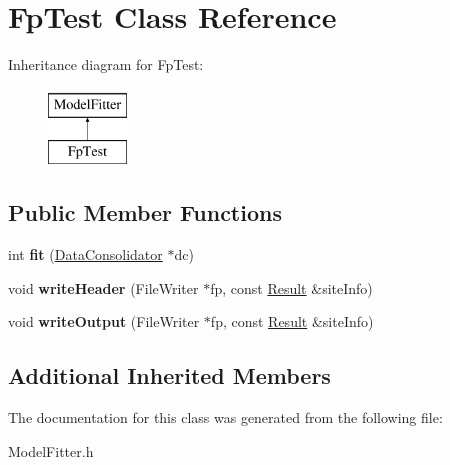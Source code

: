 \hypertarget{classFpTest}{\section{Fp\-Test Class Reference}
\label{classFpTest}
}
Inheritance diagram for Fp\-Test\-:\begin{figure}[H]
\begin{center}
\leavevmode
\includegraphics[height=2.000000cm]{classFpTest}
\end{center}
\end{figure}
\subsection*{Public Member Functions}
\begin{DoxyCompactItemize}
\item 
\hypertarget{classFpTest_ab655e9538e35ed22245a30f49ace14b4}{int {\bfseries fit} (\hyperlink{classDataConsolidator}{Data\-Consolidator} $\ast$dc)}\label{classFpTest_ab655e9538e35ed22245a30f49ace14b4}

\item 
\hypertarget{classFpTest_a6139c4ef019c267eda9a5fc8baabb3c6}{void {\bfseries write\-Header} (File\-Writer $\ast$fp, const \hyperlink{classResult}{Result} \&site\-Info)}\label{classFpTest_a6139c4ef019c267eda9a5fc8baabb3c6}

\item 
\hypertarget{classFpTest_a7bc54d5ccb09f8e8858717c8f57abfa4}{void {\bfseries write\-Output} (File\-Writer $\ast$fp, const \hyperlink{classResult}{Result} \&site\-Info)}\label{classFpTest_a7bc54d5ccb09f8e8858717c8f57abfa4}

\end{DoxyCompactItemize}
\subsection*{Additional Inherited Members}


The documentation for this class was generated from the following file\-:\begin{DoxyCompactItemize}
\item 
Model\-Fitter.\-h\end{DoxyCompactItemize}
